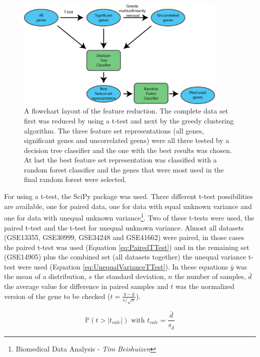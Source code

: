 \documentclass[10pt,a4paper]{report}
\begin{document}
	\begin{figure}[H]
		\includegraphics[width=0.9\textwidth]{FeatureReductionLayout.png}
		\caption{A flowchart layout of the feature reduction. The complete data set first was reduced by using a t-test and next by the greedy clustering algorithm. The three feature set representations (all genes, significant genes and uncorrelated geens) were all three tested by a decision tree classifier and the one with the best results was chosen. At last the best feature set representation was classified with a random forest classifier and the genes that were most used in the final random forest were selected.}
		\label{fig:FeatureReductionLayout}
	\end{figure}
	
	
	For using a t-test, the SciPy package was used. Three different t-test possibilities are available, one for paired data, one for data with equal unknown variance and one for data with unequal unknown variance\footnote{\label{fn:BDA}Biomedical Data Analysis - \textit{Tim Beishuizen}}. Two of these t-tests were used, the paired t-test and the t-test for unequal unknown variance. Almost all datasets (GSE13355, GSE30999, GSE34248 and GSE41662) were paired, in those cases the paired t-test was used (Equation \ref{eq:PairedTTest}) and in the remaining set (GSE14905) plus the combined set (all datasets together) the unequal variance t-test were used (Equation \ref{eq:UnequalVarianceTTest}). In these equations $\bar{y}$ was the mean of a distribution, $s$ the standard deviation, $n$ the number of samples, $\bar{d}$ the average value for difference in paired samples and $t$ was the normalized version of the gene to be checked ($t = \frac{y - \bar{y}}{s/\sqrt{n}}$).  
	
	\begin{equation}
	\label{eq:PairedTTest}
	\mathbb{P}(t > |t_{calc}|) \text{ with } t_{calc} =\frac{\bar{d}}{s_{\bar{d}}}
	\end{equation}
	
\end{document}
